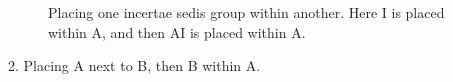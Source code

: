 \documentclass[english]{article}
\newcommand{\lyxdot}{.}
\begin{document}
\begin{figure}

\caption{\label{fig:Placing-one-incertae}Placing one incertae sedis group
within another.
Here I is placed within A, and then AI is placed within
A.}
\end{figure}

2. Placing A next to B, then B within A.
\end{document}
